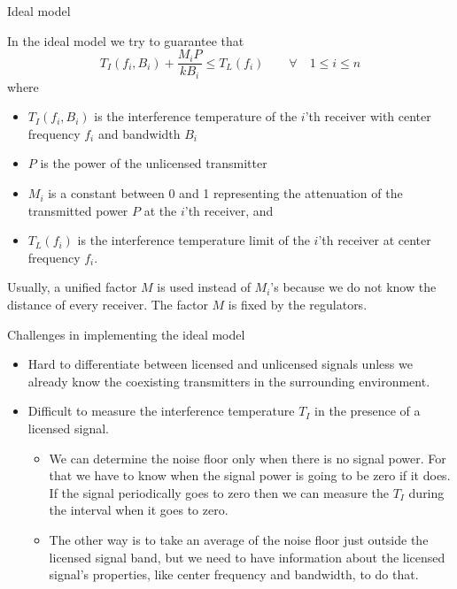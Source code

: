 \documentclass[mathserif]{beamer}
\begin{document}
\begin{frame}{Ideal model}

In the ideal model we try to guarantee that
\begin{equation}
    T_I(f_i,B_i) + \frac{M_iP}{kB_i} \leq T_L(f_i) \qquad \forall \quad 1 \leq i \leq n \label{idealModel}
\end{equation}
where

\pause
\begin{itemize}
	
	\item $T_I(f_i,B_i)$ is  the interference temperature of the $i$'th receiver with center frequency $f_i$ and bandwidth $B_i$
	\item $P$ is the power of the unlicensed transmitter
	\item $M_i$ is a constant between 0 and 1 representing the attenuation of the  transmitted power $P$ at the $i$'th receiver, and
	\item $T_L(f_i)$ is the interference temperature limit of the $i$'th receiver at center frequency $f_i$.
\end{itemize}

\pause
Usually, a unified factor $M$ is used instead of $M_i$'s because we do not know the distance of every receiver. The factor $M$ is fixed by the regulators.

\end{frame}

\begin{frame}{Challenges in implementing the ideal model}

\begin{itemize}
    \item Hard to differentiate between licensed and unlicensed signals unless we already know the coexisting transmitters in the surrounding environment.
    \item Difficult to measure the interference temperature $T_I$ in the presence of a licensed signal. \begin{itemize}
    \item We can determine the noise floor only when there is no signal power. For that we have to know when the signal power is going to be zero if it does. If the signal periodically goes to zero then we can measure the $T_I$ during the interval when it goes to zero. 
    \item The other way is to take an average of the noise floor just outside the licensed signal band, but we need to have information about the licensed signal's properties, like center frequency and bandwidth, to do that.
    \end{itemize}
\end{itemize}

\end{frame}
\end{document}

